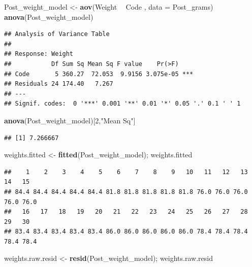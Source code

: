 \documentclass[12pt,]{article}
\newenvironment{Shaded}{\begin{snugshade}}{\end{snugshade}}
\newcommand{\KeywordTok}[1]{\textcolor[rgb]{0.13,0.29,0.53}{\textbf{#1}}}
\newcommand{\DataTypeTok}[1]{\textcolor[rgb]{0.13,0.29,0.53}{#1}}
\newcommand{\DecValTok}[1]{\textcolor[rgb]{0.00,0.00,0.81}{#1}}
\newcommand{\StringTok}[1]{\textcolor[rgb]{0.31,0.60,0.02}{#1}}
\newcommand{\OperatorTok}[1]{\textcolor[rgb]{0.81,0.36,0.00}{\textbf{#1}}}
\newcommand{\NormalTok}[1]{#1}
\begin{document}
\begin{Shaded}
\begin{Highlighting}[]
\NormalTok{Post_weight_model <-}\StringTok{ }\KeywordTok{aov}\NormalTok{(Weight }\OperatorTok{~}\StringTok{ }\NormalTok{Code , }\DataTypeTok{data =}\NormalTok{ Post_grams)}
\KeywordTok{anova}\NormalTok{(Post_weight_model)}
\end{Highlighting}
\end{Shaded}

\begin{verbatim}
## Analysis of Variance Table
## 
## Response: Weight
##           Df Sum Sq Mean Sq F value    Pr(>F)    
## Code       5 360.27  72.053  9.9156 3.075e-05 ***
## Residuals 24 174.40   7.267                      
## ---
## Signif. codes:  0 '***' 0.001 '**' 0.01 '*' 0.05 '.' 0.1 ' ' 1
\end{verbatim}

\begin{Shaded}
\begin{Highlighting}[]
\KeywordTok{anova}\NormalTok{(Post_weight_model)[}\DecValTok{2}\NormalTok{,}\StringTok{"Mean Sq"}\NormalTok{]}
\end{Highlighting}
\end{Shaded}

\begin{verbatim}
## [1] 7.266667
\end{verbatim}

\begin{Shaded}
\begin{Highlighting}[]
\NormalTok{weights.fitted <-}\StringTok{ }\KeywordTok{fitted}\NormalTok{(Post_weight_model); weights.fitted}
\end{Highlighting}
\end{Shaded}

\begin{verbatim}
##    1    2    3    4    5    6    7    8    9   10   11   12   13   14   15 
## 84.4 84.4 84.4 84.4 84.4 81.8 81.8 81.8 81.8 81.8 76.0 76.0 76.0 76.0 76.0 
##   16   17   18   19   20   21   22   23   24   25   26   27   28   29   30 
## 83.4 83.4 83.4 83.4 83.4 86.0 86.0 86.0 86.0 86.0 78.4 78.4 78.4 78.4 78.4
\end{verbatim}

\begin{Shaded}
\begin{Highlighting}[]
\NormalTok{weights.raw.resid <-}\StringTok{ }\KeywordTok{resid}\NormalTok{(Post_weight_model); weights.raw.resid }
\end{Highlighting}
\end{Shaded}
\end{document}
